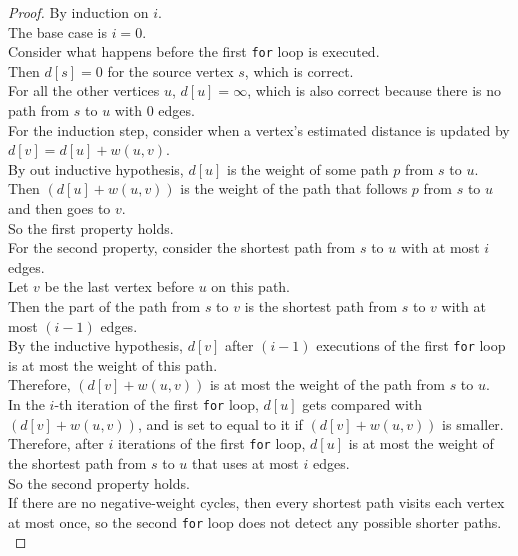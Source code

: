 \documentclass[12pt]{article}
\theoremstyle{plain}
\theoremstyle{definition}
\begin{document}
\begin{proof}
By induction on $i$. \\

The base case is $i = 0$. \\
Consider what happens before the first \texttt{for} loop is executed. \\
Then $d[s] = 0$ for the source vertex $s$, which is correct. \\
For all the other vertices $u$, $d[u] = \infty$, which is also correct because there is no path from $s$ to $u$ with 0 edges. \\

For the induction step, consider when a vertex's estimated distance is updated by $d[v] = d[u] + w(u, v)$. \\
By out inductive hypothesis, $d[u]$ is the weight of some path $p$ from $s$ to $u$. \\
Then $(d[u] + w(u, v))$ is the weight of the path that follows $p$ from $s$ to $u$ and then goes to $v$. \\
So the first property holds. \\

For the second property, consider the shortest path from $s$ to $u$ with at most $i$ edges. \\
Let $v$ be the last vertex before $u$ on this path. \\
Then the part of the path from $s$ to $v$ is the shortest path from $s$ to $v$ with at most $(i - 1)$ edges. \\
By the inductive hypothesis, $d[v]$ after $(i - 1)$ executions of the first \texttt{for} loop is at most the weight of this path. \\
Therefore, $(d[v] + w(u, v))$ is at most the weight of the path from $s$ to $u$. \\
In the $i$-th iteration of the first \texttt{for} loop, $d[u]$ gets compared with $(d[v] + w(u, v))$, and is set to equal to it if $(d[v] + w(u, v))$ is smaller. \\

Therefore, after $i$ iterations of the first \texttt{for} loop, $d[u]$ is at most the weight of the shortest path from $s$ to $u$ that uses at most $i$ edges. \\
So the second property holds. \\

If there are no negative-weight cycles, then every shortest path visits each vertex at most once, so the second \texttt{for} loop does not detect any possible shorter paths. \\


\end{proof}
\end{document}
